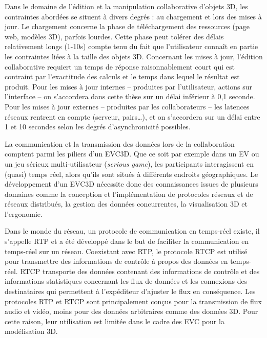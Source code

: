 Dans le domaine de l'édition et la manipulation collaborative 
d'objets \gls{3D}, les contraintes abordées se situent à divers degrés : au 
chargement 
et lors des mises à jour. Le chargement concerne la phase de téléchargement des 
ressources (page web, modèles \gls{3D}), parfois lourdes. Cette phase peut tolérer 
des délais relativement longs (1-10s) compte tenu du fait que l'utilisateur 
connaît en partie les contraintes liées à la taille des objets \gls{3D}. 
Concernant les mises à jour, l'édition 
collaborative requiert un temps de réponse raisonnablement court qui est contraint par 
l'exactitude des calculs et le temps dans lequel le résultat est produit. Pour les 
mises à jour internes -- produites par l'utilisateur, actions sur l'interface -- on 
s'accordera dans cette thèse sur un délai inférieur à 0,1 seconde. 
Pour les mises à jour externes -- produites par les collaborateurs -- les latences 
réseaux rentrent en compte (serveur, pairs\ldots), et on s'accordera sur un délai 
entre 1 et 10 secondes selon les degrés d'asynchronicité possibles. 





La communication et la transmission des données lors de la collaboration comptent parmi les piliers d'un \gls{EVC3D}. Que ce soit par exemple dans un 
\gls{EV} ou un jeu sérieux multi-utilisateur (\textit{serious game}), les 
participants interagissent en (quasi) temps réel, alors qu'ils sont situés à 
différents endroits géographiques. 
Le développement d'un \gls{EVC3D} nécessite donc des connaissances issues de 
plusieurs domaines comme la conception et l'implémentation de protocoles 
réseaux et de réseaux distribués, la gestion des données concurrentes, la visualisation 3D et l'ergonomie.

Dans le monde du réseau, un protocole de communication en temps-réel existe, il s'appelle \gls{RTP} et a 
été développé dans le but de faciliter la communication en temps-réel sur un 
réseau. Coexistant avec \gls{RTP}, le protocole \gls{RTCP} est utilisé pour 
transmettre des informations de contrôle à propos des données en temps-réel. 
\gls{RTCP} transporte des données contenant des informations de contrôle et des 
informations statistiques concernant les flux de données et les connexions des 
destinataires qui permettent à l'expéditeur d'ajuster le flux en conséquence. Les 
protocoles \gls{RTP} et \gls{RTCP} sont principalement conçus pour la 
transmission de flux audio et vidéo, moins pour des données arbitraires comme 
des données \gls{3D}. Pour cette raison, leur utilisation est limitée dans le cadre 
des 
\gls{EVC} pour la modélisation \gls{3D}. 

